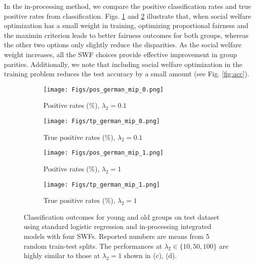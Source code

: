 \documentclass{article}[11pt]
\begin{document}
In the in-processing method, we compare the positive classification rates and true positive rates from classification. Figs. \ref{fig:pos0} and \ref{fig:tp0} illustrate that, when social welfare optimization has a small weight in training, optimizing proportional fairness and the maximin criterion leads to better fairness outcomes for both groups, whereas the other two options only slightly reduce the disparities. As the social welfare weight increases, all the SWF choices provide effective improvement in group parities. Additionally, we note that including social welfare optimization in the training problem reduces the test accuracy by a small amount (see Fig. \ref{fig:acc}). 

\begin{figure}
    \begin{subfigure}{0.8\textwidth}
    \centering
    \texttt{[image: Figs/pos\_german\_mip\_0.png]}
        \vspace{-5ex}
    \caption{Positive rates (\%), $\lambda_2 = 0.1$}
    \label{fig:pos0}
    \end{subfigure}
    \centering
    \begin{subfigure}{0.8\textwidth}
    \centering
    \texttt{[image: Figs/tp\_german\_mip\_0.png]}
        \vspace{-5ex}
    \caption{True positive rates (\%), $\lambda_2 = 0.1$}
    \label{fig:tp0}
    \end{subfigure}
    \begin{subfigure}{0.8\textwidth}
    \centering
    \texttt{[image: Figs/pos\_german\_mip\_1.png]}
        \vspace{-5ex}
    \caption{Positive rates (\%), $\lambda_2 = 1$}
    \label{fig:pos1}
    \end{subfigure}
    \centering
    \begin{subfigure}{0.8\textwidth}
    \centering
    \texttt{[image: Figs/tp\_german\_mip\_1.png]}
        \vspace{-5ex}
    \caption{True positive rates (\%), $\lambda_2 = 1$}
    \label{fig:tp1}
    \end{subfigure}
    \caption{\small{Classification outcomes for young and old groups on test dataset using standard logistic regression and in-processing integrated models with four SWFs. Reported numbers are means from 5 random train-test splits. The performances at $\lambda_2 \in \{10,50,100\}$ are highly similar to those at $\lambda_2=1$ shown in (c), (d).}}
    \label{fig:pred-perf}
\end{figure}
\end{document}
